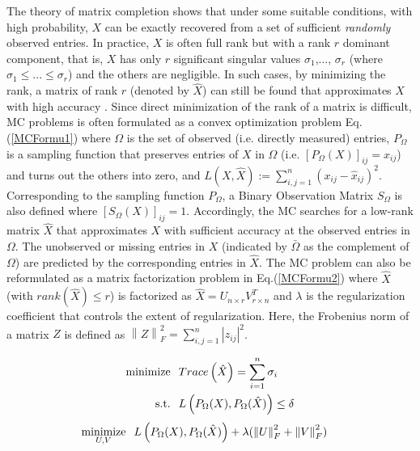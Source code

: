 The theory of matrix completion \cite{Candes:2009} shows that under some suitable conditions, with high probability, $X$ can be exactly recovered from a set of sufficient \emph{randomly} observed entries. In practice, $X$ is often full rank but
with a rank $r$ dominant component, that is, $X$ has only $r$ significant singular values $\sigma_{1}$,..., $\sigma_{r}$ (where $\sigma_{1} \leq ... \leq \sigma_{r}$) and the others are negligible. In such cases, by minimizing the rank, a matrix of rank $r$ (denoted by $\hat{X}$) can still be found that approximates $X$ with high accuracy \cite{YLiao:2011}\cite{Candes:2009}\cite{Keshavan:2009}. Since direct minimization of the rank of a matrix is difficult, MC problems is often formulated as a convex optimization problem Eq.(\ref{MCFormu1}) where $\Omega$ is the set of observed (i.e. directly measured) entries, $P_{\Omega}$ is a sampling function that preserves entries of $X$ in $\Omega$ (i.e. $[P_{\Omega}(X)]_{ij}=x_{ij}$) and turns out the others into zero, and $L(X,\hat{X}):=\sum_{i,j=1}^{n} (x_{ij}-\hat{x}_{ij})^{2}$. Corresponding to the sampling function $P_{\Omega}$, a Binary Observation Matrix $S_{\Omega}$ is also defined where $[S_{\Omega}(X)]_{ij}=1$. Accordingly, the MC searches for a low-rank matrix $\hat{X}$ that approximates $X$ with sufficient accuracy at the observed entries in $\Omega$. The unobserved or missing entries in $X$ (indicated by $\bar{\Omega}$ as the complement of $\Omega$) are predicted by the corresponding entries in $\hat{X}$. The MC problem can also be reformulated as a matrix factorization problem in Eq.(\ref{MCFormu2}) where $\hat{X}$ (with $rank(\hat{X}) \leq r$) is factorized as $\hat{X}=U_{n \times r}V_{r \times n}^{T}$ and $\lambda$ is the regularization coefficient that controls the extent of regularization. Here, the Frobenius norm of a matrix $Z$ is defined as $\left\|Z\right\|_{F}^{2}=\sum_{i,j=1}^{n} \left|z_{ij}\right|^{2}$. 

\begin{equation}\label{MCFormu1}
\small{
\begin{aligned}
\text{minimize} & \hspace{0.25cm} Trace \left( \hat{X} \right) = \sum_{i=1}^{n} \sigma_{i} \\
\text{s.t.} &  \hspace{0.25cm}  L\left(P_{\Omega}(X),P_{\Omega}(\hat{X})\right) \leq \delta
\end{aligned}
}
\end{equation}
\begin{equation}\label{MCFormu2}
\small{
\begin{aligned}
\underset{U,V}{\text{minimize}} & \hspace{0.25cm} L\left(P_{\Omega}(X),P_{\Omega}(\hat{X})\right) + \lambda ( \left\|U\right\|_{F}^{2} + \left\|V\right\|_{F}^{2} ) 
\end{aligned}
}
\end{equation}

